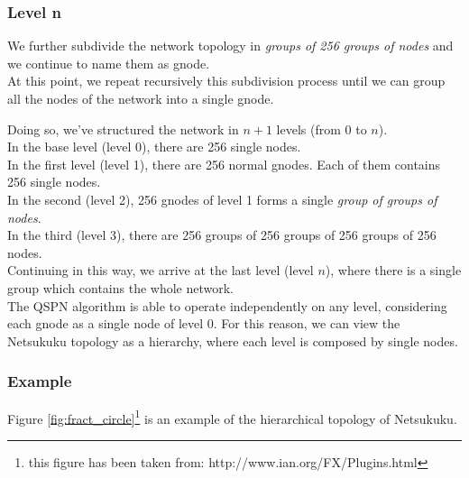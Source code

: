\documentclass[a4paper]{article}
\newcommand{\href}[2]{ #1 }
\begin{document}
\subsubsection{Level n}
We further subdivide the network topology in \emph{groups of 256 groups of nodes}
and we continue to name them as gnode.\\
At this point, we repeat recursively this subdivision process until
we can group all the nodes of the network into a single gnode.

Doing so, we've structured the network in $n+1$ levels (from $0$ to $n$).\\
In the base level (level 0), there are 256 single nodes.\\
In the first level (level 1), there are 256 normal gnodes. Each of them
contains 256 single nodes.\\
In the second (level 2), 256 gnodes of level 1 forms a single \emph{group of
groups of nodes}.\\
In the third (level 3), there are 256 groups of 256 groups of 256 groups of
256 nodes.\\
Continuing in this way, we arrive at the last level (level $n$), where there
is a single group which contains the whole network.\\

The QSPN algorithm is able to operate independently on any level,
considering each gnode as a single node of level 0.
For this reason, we can view the Netsukuku topology as a hierarchy, where each
level is composed by single nodes.

\subsubsection*{Example}

Figure \ref{fig:fract_circle}\footnote{this figure has been taken from:
\href{http://www.ian.org/FX/Plugins.html}{http://www.ian.org/FX/Plugins.html}}
is an example of the hierarchical topology of Netsukuku.
\end{document}
